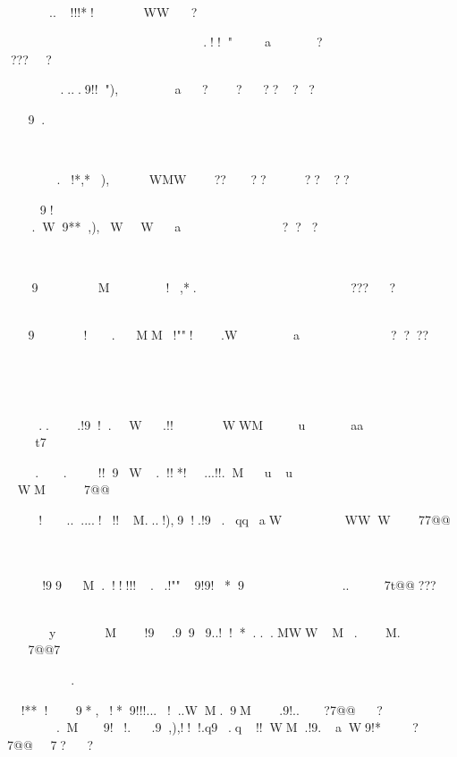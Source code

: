 	
	


..!!!*!
WW
?





	

.!!"
a?
????






....9!!"),
a??????






9.




	.!*,*),

WMW????????


		9!	.W9**,),WWa???




9
M!,*.????

	
9!.MM!""!.Wa????




	

	

...!9!.W.!!WWMuaa
t7

		

..!!9W.!!*!...!!.Muu
WM7@@



!......!!!M...!),9!.!9.qqaWWWW77@@




	

!99M.!!!!!..!""9!9!*9..7t@@???



yM!9.999..!!*...MWWM.M.
7@@7



.

!**!9*,!*9!!!...!..WM.9M.9!..?7@@?
.M
9!!..9,),!!!.q9.q!!WM.!9.aW9!*?7@@7??



